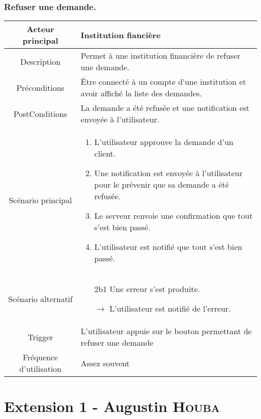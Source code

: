 \documentclass{article}
\begin{document}
\subsubsection{Refuser une demande.}
\begin{table}[h]
   \begin{tabular}{|c|p{10cm}|}
      \hline
      Acteur principal&Institution fiancière\\
      \hline
      Description&Permet à une institution financière de refuser une demande.\\
      \hline
      Préconditions&Être connecté à un compte d'une institution et avoir affiché la liste des demandes.\\
      \hline
      PostConditions&La demande a été refusée et une notification est envoyée à l'utilisateur.\\
      \hline
      Scénario principal& 
            \begin{enumerate}
               \item L'utilisateur approuve la demande d'un client.
               \item Une notification est envoyée à l'utilisateur pour le prévenir que sa demande a été refusée.
               \item Le serveur renvoie une confirmation que tout s'est bien passé.
               \item L'utilisateur est notifié que tout s'est bien passé.
            \end{enumerate}     \\
      \hline
      Scénario alternatif&
            \begin{itemize}
               \item[2b1] Une erreur s'est produite.
               \item[$\rightarrow$] L'utilisateur est notifié de l'erreur.  
            \end{itemize}\\
      \hline
      Trigger&L'utilisateur appuie sur le bouton permettant de refuser une demande\\
      \hline
      Fréquence d'utilisation&Assez souvent\\
      \hline
   \end{tabular}
\end{table}

\newpage

\section{Extension 1 - Augustin \textsc{Houba}}
\end{document}
